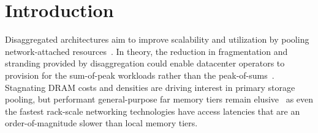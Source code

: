 \section{Introduction}
\label{sec:intro}




Disaggregated architectures aim to improve scalability and utilization
by pooling network-attached
resources~\cite{dredbox,firebox,blade-server,legoos}. In theory, the
reduction in fragmentation and stranding provided by disaggregation
could enable datacenter operators to provision for the sum-of-peak
workloads rather than the peak-of-sums~\cite{dsnf,supernic}.
Stagnating DRAM costs and densities are driving interest in primary
storage pooling, but performant general-purpose far memory tiers
remain
elusive~\cite{fastswap,3po,kona,infiniswap,hydra,leap,legoos,dilos} as
even the fastest rack-scale networking technologies have access
latencies that are an order-of-magnitude slower than local memory
tiers.

